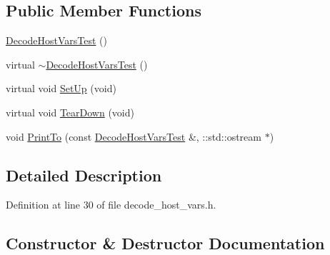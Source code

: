 \subsection*{Public Member Functions}
\begin{DoxyCompactItemize}
\item 
\hyperlink{classclang_1_1tidy_1_1pagesjaunes_1_1test_1_1_decode_host_vars_test_a353f87a662eae9c1a08c560c78d15e72}{Decode\+Host\+Vars\+Test} ()
\item 
virtual \hyperlink{classclang_1_1tidy_1_1pagesjaunes_1_1test_1_1_decode_host_vars_test_a69f07d8569ef3b9f8c6cf44de9f44136}{$\sim$\+Decode\+Host\+Vars\+Test} ()
\item 
virtual void \hyperlink{classclang_1_1tidy_1_1pagesjaunes_1_1test_1_1_decode_host_vars_test_ab98cf4e7a17ee4215137fccdc211643d}{Set\+Up} (void)
\item 
virtual void \hyperlink{classclang_1_1tidy_1_1pagesjaunes_1_1test_1_1_decode_host_vars_test_a6696770e9bf65be40dd22700e48e3b83}{Tear\+Down} (void)
\item 
void \hyperlink{classclang_1_1tidy_1_1pagesjaunes_1_1test_1_1_decode_host_vars_test_a77d3906a7264937c765361c94fca8760}{Print\+To} (const \hyperlink{classclang_1_1tidy_1_1pagesjaunes_1_1test_1_1_decode_host_vars_test}{Decode\+Host\+Vars\+Test} \&, \+::std\+::ostream $\ast$)
\end{DoxyCompactItemize}


\subsection{Detailed Description}


Definition at line 30 of file decode\+\_\+host\+\_\+vars.\+h.



\subsection{Constructor \& Destructor Documentation}
\mbox{\label{classclang_1_1tidy_1_1pagesjaunes_1_1test_1_1_decode_host_vars_test_a353f87a662eae9c1a08c560c78d15e72}} 
